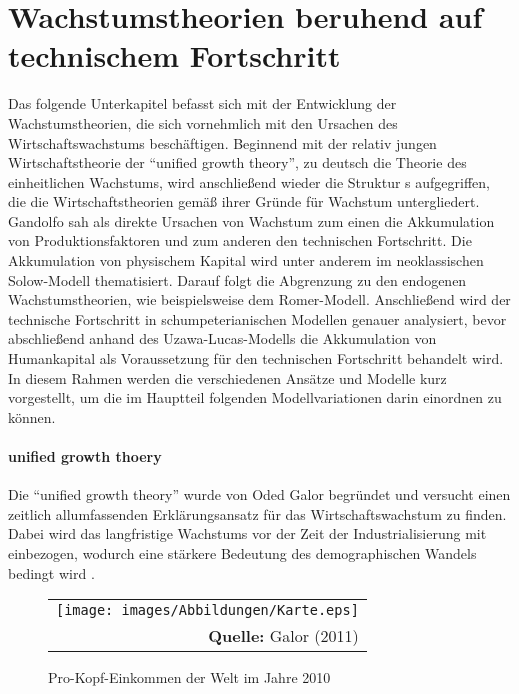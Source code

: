 
\section[Wachstumstheorien beruhend auf technischem Fortschritt]{Wachstumstheorien beruhend auf\\ technischem Fortschritt }\label{sec:Wachstumstheorien}
Das folgende Unterkapitel befasst sich mit der Entwicklung der Wachstumstheorien, die sich vornehmlich mit den Ursachen des Wirtschaftswachstums besch{\"a}ftigen. Beginnend mit der relativ jungen Wirtschaftstheorie der "`unified growth theory"', zu deutsch die Theorie des einheitlichen Wachstums, wird anschlie{\ss}end wieder die Struktur \citeauthor{Gandolfo.1998}s aufgegriffen, die die Wirtschaftstheorien gem{\"a}{\ss} ihrer Gr{\"u}nde f{\"u}r Wachstum untergliedert. Gandolfo sah als direkte Ursachen von Wachstum zum einen die Akkumulation von Produktionsfaktoren und zum anderen den technischen Fortschritt. Die Akkumulation von physischem Kapital wird unter anderem im neoklassischen Solow-Modell thematisiert. Darauf folgt die Abgrenzung zu den endogenen Wachstumstheorien, wie beispielsweise dem Romer-Modell. Anschlie{\ss}end wird der technische Fortschritt in schumpeterianischen Modellen genauer analysiert, bevor abschlie{\ss}end anhand des Uzawa-Lucas-Modells die Akkumulation von Humankapital als Voraussetzung f{\"u}r den technischen Fortschritt behandelt wird. \newline In diesem Rahmen werden die verschiedenen Ans{\"a}tze und Modelle kurz vorgestellt, um die im Hauptteil folgenden Modellvariationen darin einordnen zu k{\"o}nnen. 

\paragraph{unified growth thoery}\label{Unified}
Die "`unified growth theory"' wurde von Oded Galor begründet und versucht einen zeitlich allumfassenden Erklärungsansatz für das Wirtschaftswachstum zu finden. Dabei wird das langfristige Wachstums vor der Zeit der Industrialisierung mit einbezogen, wodurch eine stärkere Bedeutung des demographischen Wandels bedingt wird \citep{Galor.2011}.

	\begin{figure}[h!]
 \centering 
 \begin{tabular}{@{}r@{}} 
		\texttt{[image: images/Abbildungen/Karte.eps]}\\
 \footnotesize\sffamily\textbf{Quelle:} Galor (2011) %
 \end{tabular}  
		\caption{Pro-Kopf-Einkommen der Welt im Jahre 2010} 
		\label{KarteEinkommen}
	\end{figure}


